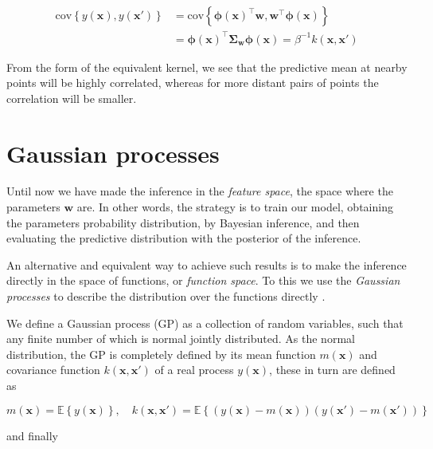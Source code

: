 \documentclass[11pt]{article} %
\begin{document}
\begin{equation}
   \begin{aligned}
      \mathrm{cov}\left\{ y(\mathbf{x}), y(\mathbf{x'})\right\} &=\mathrm{cov} \left\{ \boldsymbol{\phi}(\mathbf{x})^\top \mathbf{w}, \mathbf{w}^\top \boldsymbol{\phi}(\mathbf{x}) \right\} \\
       &= \boldsymbol{\phi}(\mathbf{x})^\top \boldsymbol{\Sigma}_\mathbf{w}\boldsymbol{\phi}(\mathbf{x}) = \beta^{-1}k(\mathbf{x},\mathbf{x'})
   \end{aligned}
\end{equation}

From the form of the equivalent kernel, we see that the predictive mean at nearby points will be highly correlated, whereas for more distant pairs of points the correlation will be smaller.

\section{Gaussian processes}

Until now we have made the inference in the \textit{feature space}, the space where the parameters $\mathbf{w}$ are. In other words, the strategy is to train our model, obtaining the parameters probability distribution, by Bayesian inference, and then evaluating the predictive distribution with the posterior of the inference.

An alternative and equivalent way to achieve such results is to make the inference directly in the space of functions, or \textit{function space}. To this we use the \textit{Gaussian processes} to describe the distribution over the functions directly \cite{Rasmussen:2005:GPM:1162254}.

We define a Gaussian process (GP) as a collection of random variables, such that any finite number of which is normal jointly distributed. As the normal distribution, the GP is completely defined by its mean function $m(\mathbf{x})$ and covariance function $k(\mathbf{x},\mathbf{x'})$ of a real process $y(\mathbf{x})$, these in turn are defined as

\begin{equation}
   m(\mathbf{x}) = \mathbb{E}\left\{ y(\mathbf{x}) \right\}, \quad
   k(\mathbf{x},\mathbf{x'}) = \mathbb{E}\left\{ \left( y(\mathbf{x}) - m(\mathbf{x}) \right) \left( y(\mathbf{x'}) - m(\mathbf{x'}) \right) \right\}
\end{equation}

and finally
\end{document}
